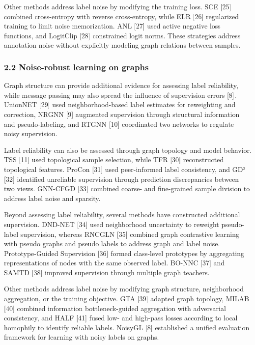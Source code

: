 Other methods address label noise by modifying the training loss. SCE {[}25{]} combined cross-entropy with reverse cross-entropy, while ELR {[}26{]} regularized training to limit noise memorization. ANL {[}27{]} used active negative loss functions, and LogitClip {[}28{]} constrained logit norms. These strategies address annotation noise without explicitly modeling graph relations between samples.

\subsubsection{2.2 Noise-robust learning on graphs}\label{noise-robust-learning-on-graphs}

Graph structure can provide additional evidence for assessing label reliability, while message passing may also spread the influence of supervision errors {[}8{]}. UnionNET {[}29{]} used neighborhood-based label estimates for reweighting and correction, NRGNN {[}9{]} augmented supervision through structural information and pseudo-labeling, and RTGNN {[}10{]} coordinated two networks to regulate noisy supervision.

Label reliability can also be assessed through graph topology and model behavior. TSS {[}11{]} used topological sample selection, while TFR {[}30{]} reconstructed topological features. ProCon {[}31{]} used peer-informed label consistency, and GD² {[}32{]} identified unreliable supervision through prediction discrepancies between two views. GNN-CFGD {[}33{]} combined coarse- and fine-grained sample division to address label noise and sparsity.

Beyond assessing label reliability, several methods have constructed additional supervision. DND-NET {[}34{]} used neighborhood uncertainty to reweight pseudo-label supervision, whereas RNCGLN {[}35{]} combined graph contrastive learning with pseudo graphs and pseudo labels to address graph and label noise. Prototype-Guided Supervision {[}36{]} formed class-level prototypes by aggregating representations of nodes with the same observed label. BO-NNC {[}37{]} and SAMTD {[}38{]} improved supervision through multiple graph teachers.

Other methods address label noise by modifying graph structure, neighborhood aggregation, or the training objective. GTA {[}39{]} adapted graph topology, MILAB {[}40{]} combined information bottleneck-guided aggregation with adversarial consistency, and HALF {[}41{]} fused low- and high-pass losses according to local homophily to identify reliable labels. NoisyGL {[}8{]} established a unified evaluation framework for learning with noisy labels on graphs.

